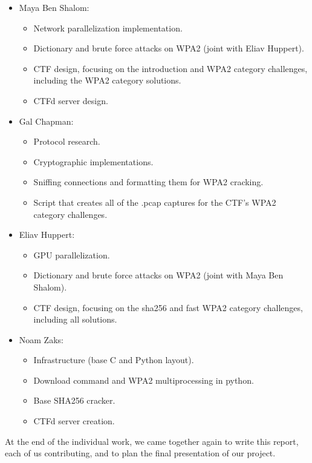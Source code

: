 \documentclass[sigconf]{acmart}
\begin{document}
\begin{itemize}
\item Maya Ben Shalom:
    \begin{itemize}
  \item Network parallelization implementation.
  \item Dictionary and brute force attacks on WPA2 (joint with Eliav Huppert).
  \item CTF design, focusing on the introduction and WPA2 category challenges, including the WPA2 category solutions.
  \item CTFd server design.
  \end{itemize}
  
\item Gal Chapman:
\begin{itemize}
  \item Protocol research.
  \item Cryptographic implementations.
  \item Sniffing connections and formatting them for WPA2 cracking.
  \item Script that creates all of the .pcap captures for the CTF's WPA2 category challenges.
\end{itemize}
  
\item Eliav Huppert:
    \begin{itemize}
  \item GPU parallelization.
  \item Dictionary and brute force attacks on WPA2 (joint with Maya Ben Shalom).
  \item CTF design, focusing on the sha256 and fast WPA2 category challenges, including all solutions.
  \end{itemize}
  
\item Noam Zaks:
\begin{itemize}
  \item Infrastructure (base C and Python layout).
  \item Download command and WPA2 multiprocessing in python.
  \item Base SHA256 cracker.
  \item CTFd server creation.
  \end{itemize}
\end{itemize}

At the end of the individual work, we came together again to write this report, each of us contributing, and to plan the final presentation of our project.
\end{document}
